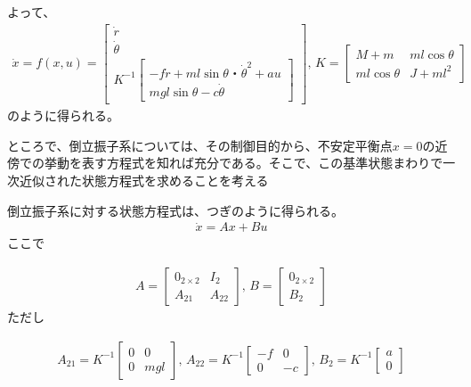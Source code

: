 \documentclass[a4j,11pt,twoside]{ujbook}
\begin{document}
			よって、
			\begin{eqnarray}
				\dot{x}
				=
				f(x,u)
				=
				\left[
					\begin{array}{c}
						\dot{r}\\
						\dot{\theta}\\
						K^{-1}\left[
						\begin{array}{c}
							- f \dot{r} + ml\sin{\theta}・\dot{\theta}^2 + au\\
							mgl\sin{\theta} - c\dot{\theta}
						\end{array}
						\right]
					\end{array}
				\right],\,
				K 
				= 
				\left[
					\begin{array}{cc}
						M+m & ml\cos{\theta}\\
						ml\cos{\theta} & J+ml^2
					\end{array}
				\right]
			\end{eqnarray}
			のように得られる。

			ところで、倒立振子系については、その制御目的から、不安定平衡点$x=0$の近傍での挙動を表す方程式を知れば充分である。そこで、この基準状態まわりで一次近似された状態方程式を求めることを考える
			
			倒立振子系に対する状態方程式は、つぎのように得られる。
			\begin{eqnarray}
				\dot{x} = Ax + Bu
				\label{eq:xdot}
			\end{eqnarray}
			ここで

			\begin{eqnarray*}
				A = \left[
				\begin{array}{cc}
					0_{2×2} & I_2\\
					A_{21} & A_{22}
				\end{array}
				\right],\,
				B = \left[
				\begin{array}{c}
					0_{2×2}\\
					B_2
				\end{array}
				\right]
			\end{eqnarray*}
			ただし

			\begin{eqnarray*}
				A_{21} = K^{-1}\left[
				\begin{array}{cc}
					0 &  0 \\
					0 & mgl
				\end{array}
				\right],\,
				A_{22} = K^{-1}\left[
				\begin{array}{cc}
					-f &  0 \\
					0 & -c
				\end{array}
				\right]
				,\,
				B_{2} = K^{-1}\left[
				\begin{array}{c}
					a\\
					0
				\end{array}
				\right]
				\nonumber
			\end{eqnarray*}
\end{document}
